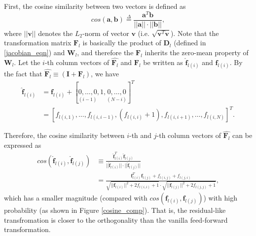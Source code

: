 First, the cosine similarity between two vectors is defined as
\begin{equation}
    cos(\mathbf{a}, \mathbf{b}) \overset{\Delta}{=}
    \frac{\mathbf{a}^T\mathbf{b}}{||\mathbf{a}||\cdot||\mathbf{b}||},
    \label{def_cosine}
\end{equation}
where $||\mathbf{v}||$ denotes the $L_2$-norm of vector $\mathbf{v}$
(i.e. $\sqrt{\mathbf{v}^T\mathbf{v}}$).
Note that the transformation matrix $\mathbf{F}_l$ is basically the product of $\mathbf{D}_l$
(defined in \eqref{jacobian_eqn}) and $\mathbf{W}_l$, and therefore the $\mathbf{F}_l$ inherits
the zero-mean property of $\mathbf{W}_l$.
Let the $i$-th column vectors of $\widehat{\mathbf{F}_l}$ and $\mathbf{F}_l$ be written as
$\widehat{\mathbf{f}}_{l(i)}$ and $\mathbf{f}_{l(i)}$.
By the fact that $\widehat{\mathbf{F}_l}\equiv(\mathbf{I}+\mathbf{F}_l)$, we have
\begin{equation}
    \begin{aligned}
    \widehat{\mathbf{f}}_{l(i)}
    &=\mathbf{f}_{l(i)}+[\underset{(i-1)}{0, \dots, 0}, 1, \underset{(N-i)}{0, \dots, 0}]^T\\
    &=[f_{l(i,1)},\dots,f_{l(i,i-1)},(f_{l(i,i)}+1),f_{l(i,i+1)},\dots,f_{l(i,N)}]^T.
    \end{aligned}
    \label{hat_iden_add}
\end{equation}

Therefore, the cosine similarity between $i$-th and $j$-th column vectors of
$\widehat{\mathbf{F}_l}$ can be expressed as
\begin{equation}
    \begin{aligned}
        cos(\widehat{\mathbf{f}}_{l(i)}, \widehat{\mathbf{f}}_{l(j)})
        &\equiv\frac
        {\widehat{\mathbf{f}}_{l(i)}^T\widehat{\mathbf{f}}_{l(j)}}
        {||\widehat{\mathbf{f}}_{l(i)}||\cdot||\widehat{\mathbf{f}}_{l(j)}||}\\
        &=\frac
        {\mathbf{f}_{l(i)}^T\mathbf{f}_{l(j)}+f_{l(i,j)}+f_{l(j,i)}}
        {\sqrt{||\mathbf{f}_{l(i)}||^2+2f_{l(i,i)}+1}\cdot\sqrt{||\mathbf{f}_{l(j)}||^2+2f_{l(j,j)}+1}},
    \end{aligned}
    \label{res_cosine}
\end{equation}
which has a smaller magnitude (compared with $cos(\mathbf{f}_{l(i)}, \mathbf{f}_{l(j)})$) with high
probability (as shown in Figure \ref{cosine_comp}).
That is, the residual-like transfromation is closer to the orthogonality than the vanilla
feed-forward transformation.

